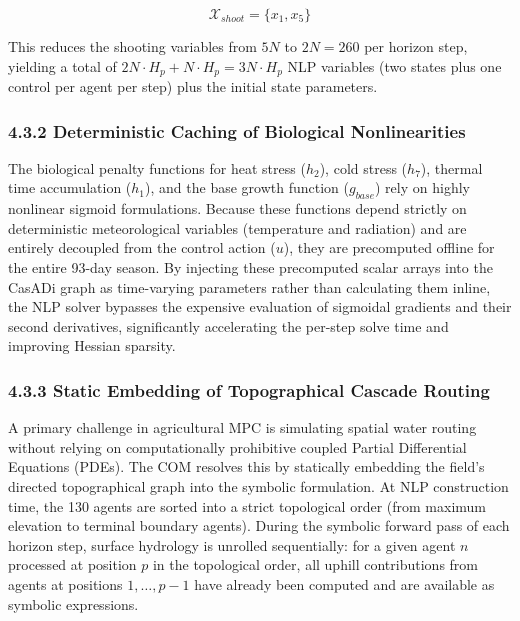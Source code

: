 \[\mathcal{X}_{shoot} = \{x_1, x_5\} \tag{16}\]

This reduces the shooting variables from \(5N\) to \(2N = 260\) per
horizon step, yielding a total of
\(2N \cdot H_p + N \cdot H_p = 3N \cdot H_p\) NLP variables (two states
plus one control per agent per step) plus the initial state parameters.

\subsubsection{4.3.2 Deterministic Caching of Biological
Nonlinearities}\label{deterministic-caching-of-biological-nonlinearities}

The biological penalty functions for heat stress (\(h_2\)), cold stress
(\(h_7\)), thermal time accumulation (\(h_1\)), and the base growth
function (\(g_{base}\)) rely on highly nonlinear sigmoid formulations.
Because these functions depend strictly on deterministic meteorological
variables (temperature and radiation) and are entirely decoupled from
the control action (\(u\)), they are precomputed offline for the entire
93-day season. By injecting these precomputed scalar arrays into the
CasADi graph as time-varying parameters rather than calculating them
inline, the NLP solver bypasses the expensive evaluation of sigmoidal
gradients and their second derivatives, significantly accelerating the
per-step solve time and improving Hessian sparsity.

\subsubsection{4.3.3 Static Embedding of Topographical Cascade
Routing}\label{static-embedding-of-topographical-cascade-routing}

A primary challenge in agricultural MPC is simulating spatial water
routing without relying on computationally prohibitive coupled Partial
Differential Equations (PDEs). The COM resolves this by statically
embedding the field's directed topographical graph into the symbolic
formulation. At NLP construction time, the 130 agents are sorted into a
strict topological order (from maximum elevation to terminal boundary
agents). During the symbolic forward pass of each horizon step, surface
hydrology is unrolled sequentially: for a given agent \(n\) processed at
position \(p\) in the topological order, all uphill contributions from
agents at positions \(1, \ldots, p-1\) have already been computed and
are available as symbolic expressions.

